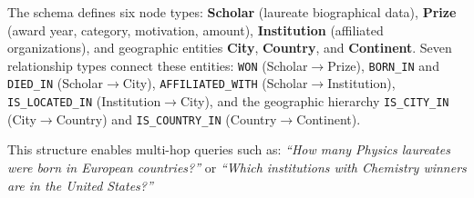 \documentclass[sigconf]{acmart}
\begin{document}
The schema defines six node types: \textbf{Scholar} (laureate biographical data), \textbf{Prize} (award year, category, motivation, amount), \textbf{Institution} (affiliated organizations), and geographic entities \textbf{City}, \textbf{Country}, and \textbf{Continent}. Seven relationship types connect these entities: \texttt{WON} (Scholar$\rightarrow$Prize), \texttt{BORN\_IN} and \texttt{DIED\_IN} (Scholar$\rightarrow$City), \texttt{AFFILIATED\_WITH} (Scholar$\rightarrow$Institution), \texttt{IS\_LOCATED\_IN} (Institution$\rightarrow$City), and the geographic hierarchy \texttt{IS\_CITY\_IN} (City$\rightarrow$Country) and \texttt{IS\_COUNTRY\_IN} (Country$\rightarrow$Continent).

This structure enables multi-hop queries such as: \textit{``How many Physics laureates were born in European countries?''} or \textit{``Which institutions with Chemistry winners are in the United States?''}
\end{document}
